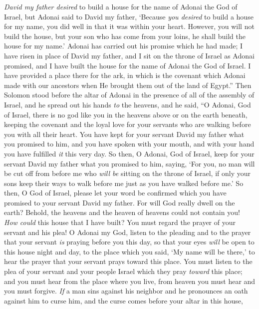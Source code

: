 \begin{biblechapter}
\verse \textit{David my father desired} to build a house for the name of Adonai the God of Israel,
\verse but Adonai said to David my father, ‘Because \textit{you desired} to build a house for my name, you did well in that it was within your heart.
\verse However, you will not build the house, but your son who has come from your loins, he shall build the house for my name.’
\verse Adonai has carried out his promise which he had made; I have risen in place of David my father, and I sit on the throne of Israel as Adonai promised, and I have built the house for the name of Adonai the God of Israel.
\verse I have provided a place there for the ark, in which is the covenant which Adonai made with our ancestors when He brought them out of the land of Egypt.”
 Then Solomon stood before the altar of Adonai in the presence of all of the assembly of Israel, and he spread out his hands \textit{to} the heavens,
\verse and he said, “O Adonai, God of Israel, there is no god like you in the heavens above or on the earth beneath, keeping the covenant and the loyal love for your servants who are walking before you with all their heart.
\verse You have kept for your servant David my father what you promised to him, and you have spoken with your mouth, and with your hand you have fulfilled \textit{it} this very day.
\verse So then, O Adonai, God of Israel, keep for your servant David my father what you promised to him, saying, ‘For you, no man will be cut off from before me who \textit{will be} sitting on the throne of Israel, if only your sons keep their ways to walk before me just as you have walked before me.’
\verse So then, O God of Israel, please let your word be confirmed which you have promised to your servant David my father.
\verse For will God really dwell on the earth? Behold, the heavens and the heaven of heavens could not contain you! \textit{How could} this house that I have built?
\verse You must regard the prayer of your servant and his plea! O Adonai my God, listen to the pleading and to the prayer that your servant \textit{is} praying before you this day,
\verse so that your eyes \textit{will} be open to this house night and day, to the place which you said, ‘My name will be there,’ to hear the prayer that your servant prays toward this place.
\verse You must listen to the plea of your servant and your people Israel which they pray \textit{toward} this place; and you must hear from the place where you live, from heaven you must hear and you must forgive.
\verse \textit{If} a man sins against his neighbor and he pronounces an oath against him to curse him, and the curse comes before your altar in this house,

\end{biblechapter}
